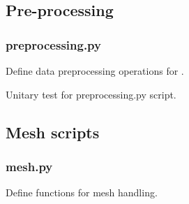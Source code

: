 \documentclass[letterpaper,10pt,english]{sphinxmanual}
\begin{document}
\subsection{Pre-processing}
\label{\detokenize{Manual:pre-processing}}

\subsubsection{preprocessing.py}
\label{\detokenize{petgem/preprocessing:module-petgem.preprocessing}}\label{\detokenize{petgem/preprocessing:preprocessing-py}}\label{\detokenize{petgem/preprocessing::doc}}
Define data preprocessing operations for .

\begin{fulllineitems}
\label{\detokenize{petgem/preprocessing:petgem.preprocessing.unitary_test}}
Unitary test for preprocessing.py script.

\end{fulllineitems}



\subsection{Mesh scripts}
\label{\detokenize{Manual:mesh-scripts}}

\subsubsection{mesh.py}
\label{\detokenize{petgem/mesh:module-petgem.mesh}}\label{\detokenize{petgem/mesh:mesh-py}}\label{\detokenize{petgem/mesh::doc}}
Define functions for mesh handling.
\end{document}
